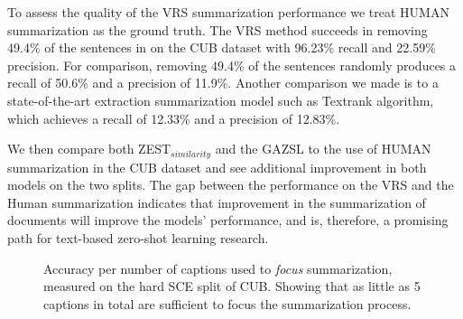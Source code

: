 \documentclass[11pt,a4paper]{article}
\newcommand\yuval[1]{\textcolor{darkpink}{\textbf{YUVAL:} #1 }}
\newcommand\reut[1]{\textcolor{green}{\textbf{REUT:} #1 }}
\begin{document}


To assess the quality of the VRS summarization performance we treat HUMAN summarization as the ground truth. The VRS method succeeds in removing 49.4\% of the sentences in on the CUB dataset with 96.23\% recall and 22.59\% precision. For comparison, removing 49.4\% of the sentences randomly produces a recall of 50.6\% and a precision of 11.9\%.
Another comparison we made is to a state-of-the-art extraction summarization model such as  Textrank \citep{mihalcea2004textrank} algorithm, which achieves a recall of 12.33\% and a precision of 12.83\%.

 
We then compare both ZEST$_{similarity}$ and the GAZSL to the use of HUMAN summarization in the CUB dataset and see additional improvement in both models on the two splits. The gap between the performance on the VRS and the Human summarization indicates that improvement in the summarization of documents will improve the models' performance, and is, therefore, a promising path for text-based zero-shot learning research.


\begin{figure}[t]
\centering
{}
 \caption{Accuracy per number of captions used to \textit{focus}   summarization, measured on the hard SCE split of CUB. Showing that as little as 5 captions in total are sufficient to focus the summarization process.
 }
\label{fig:captions}
\end{figure}
\end{document}
